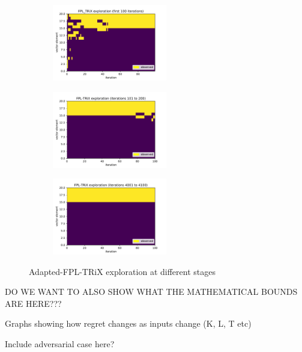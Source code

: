 \begin{figure}[h!]
\centering
\begin{subfigure}{.33\textwidth}
  \centering
  \includegraphics[width=50mm]{../plots/basicFPL_100iters.pdf}
\end{subfigure}%
\begin{subfigure}{.33\textwidth}
  \centering
  \includegraphics[width=50mm]{../plots/basicFPL_100_200iters.pdf}
\end{subfigure}
\begin{subfigure}{.33\textwidth}
  \centering
  \includegraphics[width=50mm]{../plots/basicFPL_4000_4100iters.pdf}
\end{subfigure}
\caption{Adapted-FPL-TRiX exploration at different stages}
\label{fig:ullm-particle}
\end{figure}




DO WE WANT TO ALSO SHOW WHAT THE MATHEMATICAL BOUNDS ARE HERE???

Graphs showing how regret changes as inputs change (K, L, T etc)

Include adversarial case here?


\pagebreak


